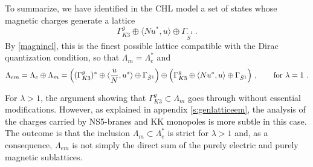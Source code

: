 \documentclass[a4paper,11pt]{article}
\newcommand{\ZZ}{\mathbb{Z}}
\newcommand{\E}{\mathcal{E}}
\numberwithin{equation}{section}
\def\be{\begin{equation}}
\def\ee{\end{equation}}
\begin{document}
 \medskip 
 
 To summarize, we have identified in the CHL model a set of states whose magnetic charges generate a lattice
\be \Gamma_{K3}^g\oplus \langle N u^*, u\rangle \oplus \Gamma_{\tilde S^1}\ .
\ee By \eqref{magnincl}, this is the finest possible lattice compatible with the Dirac quantization condition, so that $\Lambda_m=\Lambda_e^*$ and \be \Lambda_{em}=\Lambda_e\oplus\Lambda_m=\Bigl((\Gamma_{K3}^g)^*\oplus \langle \frac{u}{N}, u^*\rangle \oplus \Gamma_{\tilde S^1}\Bigr)\oplus \Bigl(\Gamma_{K3}^g\oplus \langle N u^*, u\rangle \oplus \Gamma_{\tilde S^1}\Bigr)\ ,\qquad \text{for }\lambda=1\ . \ee


\medskip

For $\lambda>1$, the argument showing that $\Gamma_{K3}^g\subset \Lambda_m$ goes through without essential modifications. However,  as explained in appendix \ref{s:genlatticeem}, the analysis of the charges carried by NS5-branes and KK monopoles is more subtle in this case. The outcome is that the inclusion $\Lambda_m\subset \Lambda_e^*$ is strict for $\lambda>1$ and, as a consequence, $\Lambda_{em}$ is not simply the direct sum of the purely electric and purely magnetic sublattices.




%
\end{document}
